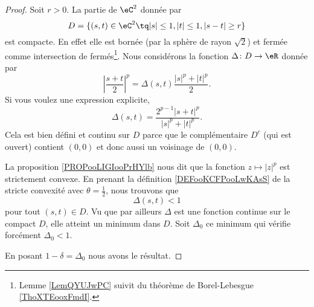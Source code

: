 \begin{proof}
	Soit \( r>0\). La partie de \( \eC^2\) donnée par
	\begin{equation}
		D=\{ (s,t)\in \eC^2\tq | s |\leq 1, | t |\leq 1,| s-t |\geq r \}
	\end{equation}
	est compacte. En effet elle est bornée (par la sphère de rayon \( \sqrt{ 2 }\)) et fermée comme intersection de fermés\footnote{Lemme \ref{LemQYUJwPC} suivit du théorème de Borel-Lebesgue \ref{ThoXTEooxFmdI}.}. Nous considérons la fonction \( \Delta\colon D\to \eR\) donnée par
	\begin{equation}
		\left| \frac{ s+t }{2} \right|^p=\Delta(s,t)\frac{ | s |^p+| t |^p }{2}.
	\end{equation}
	Si vous voulez une expression explicite,
	\begin{equation}
		\Delta(s,t)=\frac{ 2^{p-1}| s+t |^p }{ | s |^p+| t |^p }.
	\end{equation}
	Cela est bien défini et continu sur \( D\) parce que le complémentaire \( D^c\) (qui est ouvert) contient \( (0,0)\) et donc aussi un voisinage de \( (0,0)\).

	La proposition \ref{PROPooLIGIooPrHYlb} nous dit que la fonction \( z\mapsto | z |^p\) est strictement convexe. En prenant la définition \ref{DEFooKCFPooLwKAsS} de la stricte convexité avec \( \theta=\frac{ 1 }{2}\), nous trouvons que
	\begin{equation}
		\Delta(s,t)<1
	\end{equation}
	pour tout \( (s,t)\in D\). Vu que par ailleurs \( \Delta\) est une fonction continue sur le compact \( D\), elle atteint un minimum dans \( D\). Soit \( \Delta_0\) ce minimum qui vérifie forcément \( \Delta_0<1\).

	En posant \( 1-\delta=\Delta_0\) nous avons le résultat.
\end{proof}
